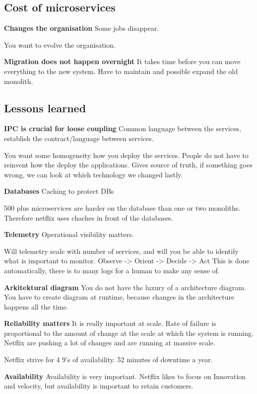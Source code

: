 {\subsection{Cost of microservices}
\textbf{Changes the organisation}
Some jobs disappear.

You want to evolve the organisation.

\textbf{Migration does not happen overnight}
It takes time before you can move everything to the new system. Have to maintain and possible expand the old monolith.

\subsection{Lessons learned}
\textbf{IPC is crucial for loose coupling}
Common language between the services, establish the contract/language between services.

You want some homogeneity how you deploy the services. People do not have to reinvent how the deploy the applications.
Gives source of truth, if something goes wrong, we can look at which technology we changed lastly.

\textbf{Databases}
Caching to protect DBs

500 plus microservices are harder on the database than one or two monoliths.
Therefore netflix uses chaches in front of the databases.

\textbf{Telemetry}
Operational visibility matters.

Will telemetry scale with number of services, and will you be able to identify what is important to monitor.
Observe -> Orient -> Decide -> Act
This is done automatically, there is to many logs for a human to make any sense of.

\textbf{Arkitektural diagram}
You do not have the luxury of a architecture diagram. You have to create diagram at runtime, because changes in the architecture happens all the time.

\textbf{Reliability matters}
It is really important at scale.
Rate of failure is proportional to the amount of change at the scale at which the system is running. Netflix are pushing a lot of changes and are running at massive scale.

Netflix strive for 4 9's of availability. 52 minutes of downtime a year.

\textbf{Availability}
Availability is very important. Netflix likes to focus on Innovation and velocity, but availability is important to retain customers.

}
